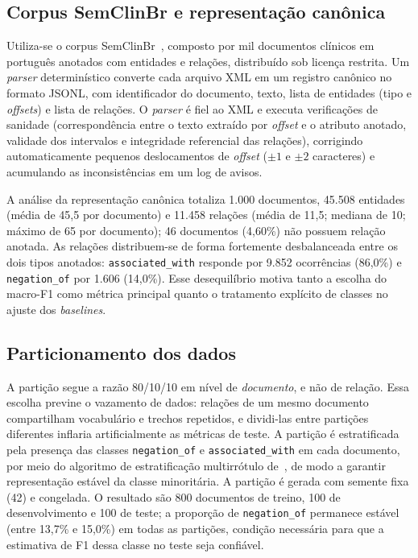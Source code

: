 \documentclass[12pt]{article}
\begin{document}
\subsection{Corpus SemClinBr e representação canônica}
Utiliza-se o corpus SemClinBr~\cite{oliveira:22}, composto por mil documentos
clínicos em português anotados com entidades e relações, distribuído sob licença
restrita. Um \emph{parser} determinístico converte cada arquivo XML em um
registro canônico no formato JSONL, com identificador do documento, texto, lista
de entidades (tipo e \emph{offsets}) e lista de relações. O \emph{parser} é fiel
ao XML e executa verificações de sanidade (correspondência entre o texto
extraído por \emph{offset} e o atributo anotado, validade dos intervalos e
integridade referencial das relações), corrigindo automaticamente pequenos
deslocamentos de \emph{offset} ($\pm1$ e $\pm2$ caracteres) e acumulando as
inconsistências em um log de avisos.

A análise da representação canônica totaliza 1.000 documentos, 45.508 entidades
(média de 45,5 por documento) e 11.458 relações (média de 11,5; mediana de 10;
máximo de 65 por documento); 46 documentos (4,60\%) não possuem relação anotada.
As relações distribuem-se de forma fortemente desbalanceada entre os dois tipos
anotados: \texttt{associated\_with} responde por 9.852 ocorrências (86,0\%) e
\texttt{negation\_of} por 1.606 (14,0\%). Esse desequilíbrio motiva tanto a
escolha do macro-F1 como métrica principal quanto o tratamento explícito de
classes no ajuste dos \emph{baselines}.

\subsection{Particionamento dos dados}
A partição segue a razão 80/10/10 em nível de \emph{documento}, e não de relação.
Essa escolha previne o vazamento de dados: relações de um mesmo documento
compartilham vocabulário e trechos repetidos, e dividi-las entre partições
diferentes inflaria artificialmente as métricas de teste. A partição é
estratificada pela presença das classes \texttt{negation\_of} e
\texttt{associated\_with} em cada documento, por meio do algoritmo de
estratificação multirrótulo de~\cite{sechidis:11}, de modo a garantir
representação estável da classe minoritária. A partição é gerada com semente fixa
(42) e congelada. O resultado são 800 documentos de treino, 100 de
desenvolvimento e 100 de teste; a proporção de \texttt{negation\_of} permanece
estável (entre 13,7\% e 15,0\%) em todas as partições, condição necessária para
que a estimativa de F1 dessa classe no teste seja confiável.
\end{document}
